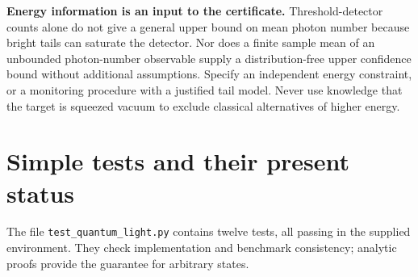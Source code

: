 \documentclass[11pt,a4paper]{article}
\begin{document}
\textbf{Energy information is an input to the certificate.} Threshold-detector
counts alone do not give a general upper bound on mean photon number because
bright tails can saturate the detector. Nor does a finite sample mean of an
unbounded photon-number observable supply a distribution-free upper confidence
bound without additional assumptions. Specify an independent energy constraint,
or a monitoring procedure with a justified tail model. Never use knowledge that
the target is squeezed vacuum to exclude classical alternatives of higher energy.

\section{Simple tests and their present status}\label{sec:tests}
The file \texttt{test\_quantum\_light.py} contains twelve tests, all passing
in the supplied environment. They check implementation and benchmark
consistency; analytic proofs provide the guarantee for arbitrary states.
\end{document}
